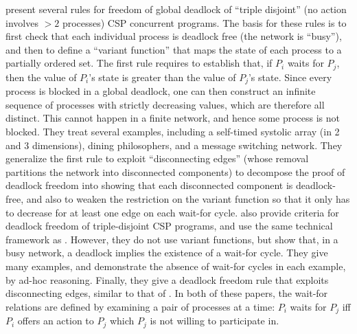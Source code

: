  present several rules for freedom of global deadlock of
``triple disjoint'' (no action involves $> 2$ processes) CSP concurrent
programs. The basis for these rules is to first check that each individual process is deadlock free
(\ie the network is ``busy''), and then to define a ``variant function'' that maps the state of each
process to a partially ordered set. The first rule requires to establish that, if $P_i$ waits for
$P_j$, then the value of $P_i$'s state is greater than the value of $P_j$'s state. 
Since every process is blocked in a global deadlock, one can then construct an infinite sequence of
processes with strictly decreasing values, which are therefore all distinct. This cannot happen in a
finite network, and hence some process is not blocked.
They treat several examples, including
a self-timed systolic array (in 2 and 3 dimensions), dining philosophers, and a message switching
network.  They generalize the first rule to exploit ``disconnecting edges'' (whose removal
partitions the network into disconnected components) to decompose the proof of deadlock freedom into
showing that each disconnected component is deadlock-free, and also to weaken the restriction on the
variant function so that it only has to decrease for at least one edge on each wait-for cycle.
%
 also provide criteria for deadlock
freedom of triple-disjoint CSP programs, and use the same technical framework as
.  However, they do not use variant functions, but show that, in a busy
network, a deadlock implies the existence of a wait-for cycle. They give many examples,
and demonstrate the absence of wait-for cycles in each example, by ad-hoc
reasoning. Finally, they give a deadlock freedom rule that exploits disconnecting edges,
similar to that of .
%
In both of these papers, the wait-for relations are defined by examining a pair of processes
at a time: $P_i$ waits for $P_j$ iff $P_i$ offers an action to $P_j$ which $P_j$ is
not willing to participate in.

